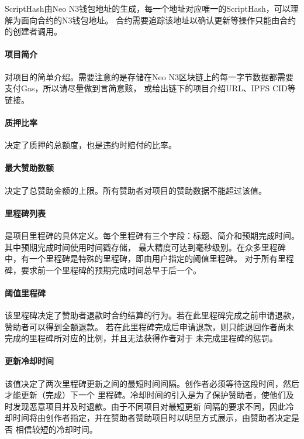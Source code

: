 \documentclass[11pt,UTF8,a4paper]{ctexart}
\begin{document}
    ScriptHash由Neo N3钱包地址的生成，每一个地址对应唯一的ScriptHash，可以理解为面向合约的N3钱包地址。
    合约需要追踪该地址以确认更新等操作只能由合约的创建者调用。

    \paragraph{项目简介}

    对项目的简单介绍。需要注意的是存储在Neo N3区块链上的每一字节数据都需要支付Gas，所以请尽量做到言简意赅，
    或给出链下的项目介绍URL、IPFS CID等链接。

    \paragraph{质押比率}

    决定了质押的总额度，也是违约时赔付的比率。

    \paragraph{最大赞助数额}

    决定了总赞助金额的上限。所有赞助者对项目的赞助数据不能超过该值。

    \paragraph{里程碑列表}

    是项目里程碑的具体定义。每个里程碑有三个字段：标题、简介和预期完成时间。其中预期完成时间使用时间戳存储，
    最大精度可达到毫秒级别。在众多里程碑中，有一个里程碑是特殊的里程碑，即由用户指定的阈值里程碑。
    对于所有里程碑，要求前一个里程碑的预期完成时间总早于后一个。

    \paragraph{阈值里程碑}

    该里程碑决定了赞助者退款时合约结算的行为。若在此里程碑完成之前申请退款，赞助者可以得到全额退款。
    若在此里程碑完成后申请退款，则只能退回作者尚未完成的里程碑所对应的比例，并且无法获得作者对于
    未完成里程碑的惩罚。

    \paragraph{更新冷却时间}

    该值决定了两次里程碑更新之间的最短时间间隔。创作者必须等待这段时间，然后才能更新（完成）下一个
    里程碑。冷却时间的引入是为了保护赞助者，使他们及时发现恶意项目并及时退款。由于不同项目对最短更新
    间隔的要求不同，因此冷却时间将由创作者指定，并在赞助者赞助项目时以明显方式展示，由赞助者决定是否
    相信较短的冷却时间。
\end{document}
